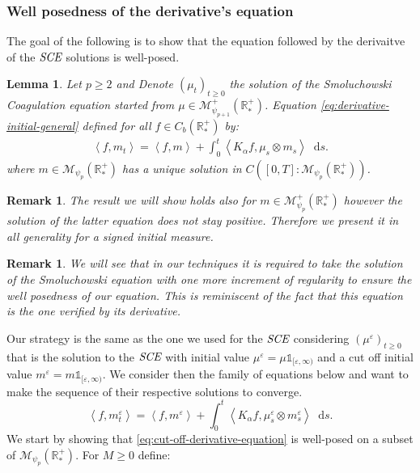 \documentclass[11pt,a4paper]{article}
\newcommand{\RR}{\mathbb{R}}
\newcommand{\RRP}{\mathbb{R}^+_*}
\newcommand{\MC}{\mathcal{M}}
\newcommand{\SCE}{\emph{SCE}}
\newcommand{\Proc}[1]{\left(#1\right)_{t\geq 0}}
\newcommand{\brac}[1]{\left\langle#1\right\rangle}
\newcommand{\dd}{\mathop{}\!\mathrm{d}}
\newtheorem{lemma}[theorem]{Lemma}
\newtheorem{remark}[theorem]{Remark}
\begin{document}
\subsubsection{Well posedness of the derivative's equation}
The goal of the following is to show that the equation followed by the derivaitve of the $\SCE$ solutions is well-posed.
\begin{lemma}\label{lem:well_posedness_derivative_eq}
    Let $p \geq 2$ and Denote $\Proc{\mu_t}$ the solution of the Smoluchowski Coagulation equation started from $\mu \in \MC^+_{\psi_{p + 1}}\left(\RRP\right)$. Equation \eqref{eq:derivative-initial-general} defined for all $f \in C_b(\RR^+_*)$ by:
    \begin{align*}
        \brac{f,m_t} = \brac{f,m} + \int_0^t \brac{K_\alpha f,\mu_s\otimes m_s} \dd s.
    \end{align*}
    where $m \in \MC_{\psi_p}\left(\RRP\right)$ has a unique solution in $C\left([0,T]:\MC_{\psi_p}\left(\RRP\right)\right)$.
\end{lemma}
\begin{remark}
    The result we will show holds also for $m \in \MC^+_{\psi_p}\left(\RRP\right) $ however the solution of the latter equation does not stay positive. Therefore we present it in all generality for a signed initial measure.
\end{remark}
\begin{remark}
    We will see that in our techniques it is required to take the solution of the Smoluchowski equation with one more increment of regularity to ensure the well posedness of our equation. This is reminiscent of the fact that this equation is the one verified by its derivative.
\end{remark}
Our strategy is the same as the one we used for the $\SCE$ considering $\Proc{\mu^\varepsilon}$ that is the solution to the $\SCE$ with initial value $\mu^\varepsilon = \mu\mathds{1}_{[\varepsilon,\infty)}$ and a cut off initial value $m^\varepsilon = m\mathds{1}_{[\varepsilon,\infty)}$. We consider then the family of equations below and want to make the sequence of their respective solutions to converge.
\begin{equation}\label{eq:cut-off-derivative-equation}
    \brac{f,m^\varepsilon_t} = \brac{f,m^\varepsilon} + \int_0^t \brac{K_\alpha f,\mu^\varepsilon_s\otimes m^\varepsilon_s} \dd s.
\end{equation}
We start by showing that \eqref{eq:cut-off-derivative-equation} is well-posed on a subset of $\MC_{\psi_p}\left(\RRP\right)$. For $M \geq 0$ define:
\end{document}

